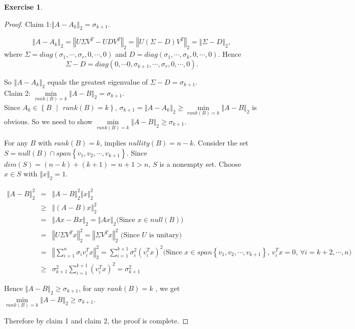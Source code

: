 \documentclass[11pt,a4paper]{article}
\renewcommand{\(}{\left(}
\renewcommand{\)}{\right)}
\newtheorem{exercise}{Exercise}
\begin{document}
  \begin{exercise}
  \end{exercise}  
  \begin{proof}
  	Claim 1:$\left\Vert A-A_{k}\right\Vert _{2}=\sigma _{k+1}$.
  	
  	$$\left\Vert A-A_{k}\right\Vert _{2}=\left\Vert U\Sigma
  	V^{T}-UDV^{T}\right\Vert _{2}=\left\Vert U\left( \Sigma -D\right)
  	V^{T}\right\Vert _{2}=\left\Vert \Sigma -D\right\Vert _{2},$$ where $\Sigma =diag\left( \sigma _{1},\cdots ,\sigma _{r},0,\cdots ,0\right) $ and $%
  	D=diag\left( \sigma _{1},\cdots ,\sigma _{k},0,\cdots ,0\right) $. Hence $$\Sigma -D=diag\left( 0,\cdots 0,\sigma _{k+1},\cdots ,\sigma _{r},0,\cdots
  	,0\right) .$$
  	
  	So $\left\Vert A-A_{k}\right\Vert _{2}$ equals the greatest
  	eigenvalue of $\Sigma -D=\sigma _{k+1}$.
  	\\
  	
  	Claim 2: $\min\limits_{rank(B)=k}\left\Vert A-B\right\Vert _{2}=\sigma _{k+1}
  	$.\\ Since $A_{k}\in \left\{ \left. B\text{ }\right\vert \text{ }%
  	rank(B)=k\right\} $, $\sigma _{k+1}=\left\Vert A-A_{k}\right\Vert _{2}\geq
  	\min\limits_{rank(B)=k}\left\Vert A-B\right\Vert _{2}$ is obvious. So we need to show $\min\limits_{rank(B)=k}\left\Vert A-B\right\Vert
  	_{2}\geq \sigma _{k+1}.$
  	
  	For any $B$ with $rank(B)=k$, implies $nullity(B)=n-k$. Consider the set $%
  	S=null(B)\cap span\left\{ v_{1},v_{2},\cdots ,v_{k+1}\right\} $. Since $%
  	dim(S)=\left( n-k\right) +\left( k+1\right) =n+1>n$, $S$ is a nonempty set.
  	Choose $x\in S$ with $\left\Vert x\right\Vert _{2}=1$.
  	
  	\begin{eqnarray*}
  		\left\Vert A-B\right\Vert _{2}^{2} &=&\left\Vert A-B\right\Vert
  		_{2}^{2}\left\Vert x\right\Vert _{2}^{2} \\
  		&\geq &\left\Vert \left( A-B\right) x\right\Vert _{2}^{2} \\
  		&=&\left\Vert Ax-Bx\right\Vert _{2}=\left\Vert Ax\right\Vert _{2}\text{
  			(Since }x\in null(B)\text{)} \\
  		&=&\left\Vert U\Sigma V^{T}x\right\Vert _{2}^{2}=\left\Vert \Sigma
  		V^{T}x\right\Vert _{2}^{2}\text{ (Since }U\text{ is unitary)} \\
  		&=&\left\Vert \sum_{i=1}^{n}\sigma _{i}v_{i}^{T}x\right\Vert
  		_{2}^{2}=\sum_{i=1}^{k+1}\sigma _{i}^{2}\left( v_{i}^{T}x\right) ^{2}\text{
  			(Since }x\in span\left\{ v_{1},v_{2},\cdots ,v_{k+1}\right\} \text{, }%
  		v_{i}^{T}x=0\text{, }\forall i=k+2,\cdots ,n\text{)} \\
  		&\geq &\sigma _{k+1}^{2}\sum\limits_{i=1}^{k+1}\left( v_{i}^{T}x\right)
  		^{2}=\sigma _{k+1}^{2}
  	\end{eqnarray*}
  	
  	Hence $\left\Vert A-B\right\Vert _{2}\geq \sigma _{k+1}$, for any $rank(B)=k$%
  	, we get $\min\limits_{rank(B)=k}\left\Vert A-B\right\Vert _{2}\geq \sigma
  	_{k+1}$.
  	
  	Therefore by claim 1 and claim 2, the proof is complete.
  	
  \end{proof} 

  
\end{document}
